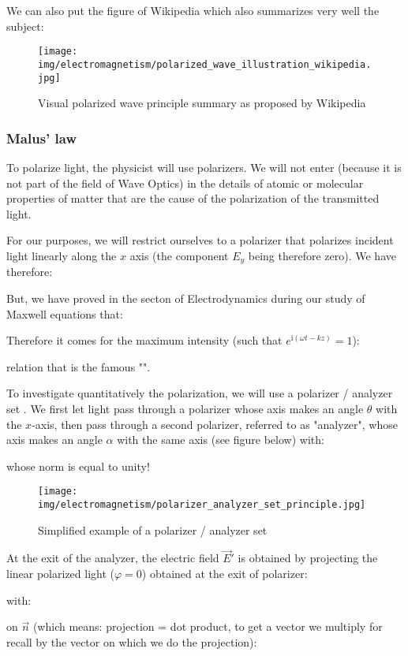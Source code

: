 	We can also put the figure of Wikipedia which also summarizes very well the subject:
	\begin{figure}[H]
		\centering
		\texttt{[image: img/electromagnetism/polarized\_wave\_illustration\_wikipedia.jpg]}
		\caption{Visual polarized wave principle summary as proposed by Wikipedia}
	\end{figure}
	
	\pagebreak
	\subsubsection{Malus' law}
	To polarize light, the physicist will use polarizers. We will not enter (because it is not part of the field of Wave Optics) in the details of atomic or molecular properties of matter that are the cause of the polarization of the transmitted light.

	For our purposes, we will restrict ourselves to a polarizer that polarizes incident light linearly along the $x$ axis (the component $E_y$ being therefore zero). We have therefore:
	
	But, we have proved in the secton of Electrodynamics during our study of Maxwell equations that:
	
	Therefore it comes for the maximum intensity (such that $e^{\mathrm{i}(\omega t-kz)}=1$):
	
	relation that is the famous "".

	To investigate quantitatively the polarization, we will use a polarizer / analyzer set . We first let light pass through a polarizer whose axis makes an angle $\theta$ with the $x$-axis, then pass through a second polarizer, referred to as "analyzer", whose axis makes an angle $\alpha$ with the same axis (see figure below) with:
	
	whose norm is equal to unity!
	\begin{figure}[H]
		\centering
		\texttt{[image: img/electromagnetism/polarizer\_analyzer\_set\_principle.jpg]}
		\caption{Simplified example of a polarizer / analyzer set}
	\end{figure}
	At the exit of the analyzer, the electric field $\vec{E}'$ is obtained by projecting the linear polarized light ($\varphi=0$) obtained at the exit of polarizer:
	
	with:
	
	on $\vec{n}$ (which means: projection = dot product, to get a vector we multiply for recall by the vector on which we do the projection):
	
